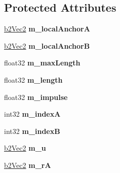 \subsection*{Protected Attributes}
\begin{DoxyCompactItemize}
\item 
\hypertarget{classb2_rope_joint_a43640240dc39c912ea1cc6e1ae9fa614}{\hyperlink{structb2_vec2}{b2\-Vec2} {\bfseries m\-\_\-local\-Anchor\-A}}\label{classb2_rope_joint_a43640240dc39c912ea1cc6e1ae9fa614}

\item 
\hypertarget{classb2_rope_joint_a57dfab74bae88c2c3284ed640825c959}{\hyperlink{structb2_vec2}{b2\-Vec2} {\bfseries m\-\_\-local\-Anchor\-B}}\label{classb2_rope_joint_a57dfab74bae88c2c3284ed640825c959}

\item 
\hypertarget{classb2_rope_joint_ace7528ca1183f34cfc79e47f46b29130}{float32 {\bfseries m\-\_\-max\-Length}}\label{classb2_rope_joint_ace7528ca1183f34cfc79e47f46b29130}

\item 
\hypertarget{classb2_rope_joint_a2cee8c35d881b0ae66d28d13c6d8d66a}{float32 {\bfseries m\-\_\-length}}\label{classb2_rope_joint_a2cee8c35d881b0ae66d28d13c6d8d66a}

\item 
\hypertarget{classb2_rope_joint_ac19ae74b5f3c104bc763e99b3986afd6}{float32 {\bfseries m\-\_\-impulse}}\label{classb2_rope_joint_ac19ae74b5f3c104bc763e99b3986afd6}

\item 
\hypertarget{classb2_rope_joint_a34875f5852d011dab695613a23adca08}{int32 {\bfseries m\-\_\-index\-A}}\label{classb2_rope_joint_a34875f5852d011dab695613a23adca08}

\item 
\hypertarget{classb2_rope_joint_aa67100c069a1a273314dfa55c9063fc7}{int32 {\bfseries m\-\_\-index\-B}}\label{classb2_rope_joint_aa67100c069a1a273314dfa55c9063fc7}

\item 
\hypertarget{classb2_rope_joint_ae95185c5ad4c119a9893294491ba1609}{\hyperlink{structb2_vec2}{b2\-Vec2} {\bfseries m\-\_\-u}}\label{classb2_rope_joint_ae95185c5ad4c119a9893294491ba1609}

\item 
\hypertarget{classb2_rope_joint_af8ae48af2656b1e605a099b8f4aa82b0}{\hyperlink{structb2_vec2}{b2\-Vec2} {\bfseries m\-\_\-r\-A}}\label{classb2_rope_joint_af8ae48af2656b1e605a099b8f4aa82b0}


\end{DoxyCompactItemize}
